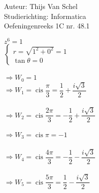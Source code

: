 \documentclass[a4paper]{article}
\newcommand{\cis}{\operatorname{cis}}
\begin{document}
  
\noindent \large Auteur: Thijs Van Schel \\
\noindent \large Studierichting: Informatica\\
\noindent \large Oefeningenreeks 1C nr. 48.1\\

\medskip

\normalsize

$z^6 = 1$ \\

$\left\{
\begin{array}{l}
r = \sqrt{1^2+0^2} = 1 \\

\tan\theta = 0
\end{array}
\right.$ \\\\

$\Rightarrow W_0 = 1$ \\

$\Rightarrow W_1 = \cis{\dfrac{\pi}{3}} = \dfrac{1}{2} + \dfrac{i\sqrt{3}}{2}$ \\\\

$\Rightarrow W_2 = \cis{\dfrac{2\pi}{3}} = -\dfrac{1}{2} + \dfrac{i\sqrt{3}}{2}$ \\\\

$\Rightarrow W_3 = \cis{\pi} = -1$ \\\\

$\Rightarrow W_4 = \cis{\dfrac{4\pi}{3}} = -\dfrac{1}{2} - \dfrac{i\sqrt{3}}{2}$ \\\\

$\Rightarrow W_5 = \cis{\dfrac{5\pi}{3}} = \dfrac{1}{2} - \dfrac{i\sqrt{3}}{2}$

\begin{thebibliography}{999}
\end{thebibliography}
\end{document}
